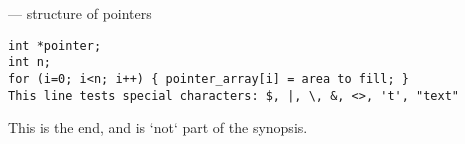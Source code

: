 \startmanpage
{}
--- structure of pointers 
\startvb\begin{verbatim}
int *pointer;
int n;
for (i=0; i<n; i++) { pointer_array[i] = area to fill; }
This line tests special characters: $, |, \, &, <>, 't', "text"
\end{verbatim}
\endvb
This is the end, and is `not` part of the synopsis.
\endmanpage

